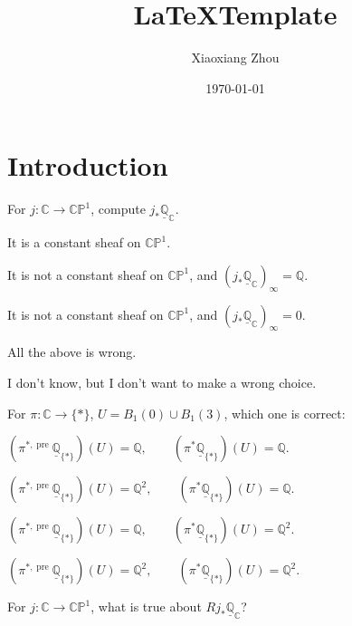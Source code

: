 \documentclass[UTF8]{amsart}
\numberwithin{equation}{section}
\theoremstyle{plain}
\numberwithin{equation}{section}
\theoremstyle{remark}
\begin{document}
\date{\today}

\title
{\LaTeX\;Template
}
\author{Xiaoxiang Zhou}
\address{School of Mathematical Sciences\\
University of Bonn\\
Bonn, 53115\\ Germany\\} 


\maketitle
\tableofcontents


\section{Introduction}
For $j: \mathbb{C} \longrightarrow \mathbb{CP}^1$, compute $j_* \underline{\mathbb{Q}}_{\mathbb{C}}$.

It is a constant sheaf on $\mathbb{CP}^1$.

It is not a constant sheaf on $\mathbb{CP}^1$, and $(j_* \underline{\mathbb{Q}}_{\mathbb{C}})_{\infty}= \mathbb{Q}$.

It is not a constant sheaf on $\mathbb{CP}^1$, and $(j_* \underline{\mathbb{Q}}_{\mathbb{C}})_{\infty}= 0$.

All the above is wrong.

I don't know, but I don't want to make a wrong choice.

For $\pi: \mathbb{C} \longrightarrow \{*\}$, $U=B_1(0) \cup B_1 (3)$, which one is correct:

$(\pi^{*,\operatorname{pre}}\underline{\mathbb{Q}}_{\{*\}})(U)=\mathbb{Q},\qquad (\pi^{*}\underline{\mathbb{Q}}_{\{*\}})(U)=\mathbb{Q}.$

$(\pi^{*,\operatorname{pre}}\underline{\mathbb{Q}}_{\{*\}})(U)=\mathbb{Q}^2,\qquad (\pi^{*}\underline{\mathbb{Q}}_{\{*\}})(U)=\mathbb{Q}.$

$(\pi^{*,\operatorname{pre}}\underline{\mathbb{Q}}_{\{*\}})(U)=\mathbb{Q},\qquad (\pi^{*}\underline{\mathbb{Q}}_{\{*\}})(U)=\mathbb{Q}^2.$

$(\pi^{*,\operatorname{pre}}\underline{\mathbb{Q}}_{\{*\}})(U)=\mathbb{Q}^2,\qquad (\pi^{*}\underline{\mathbb{Q}}_{\{*\}})(U)=\mathbb{Q}^2.$

For $j: \mathbb{C} \longrightarrow \mathbb{CP}^1$, what is true about $Rj_* \underline{\mathbb{Q}}_{\mathbb{C}}$?
\end{document}
